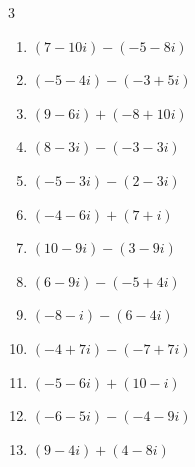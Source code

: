 \begin{multicols}{3}
\begin{enumerate}
        \phantom{$\displaystyle =12+10i$}

  \item $\displaystyle (7-10i) - (-5-8i)$

        \phantom{$\displaystyle =12-2i$}

  \item $\displaystyle (-5-4i) - (-3+5i)$

        \phantom{$\displaystyle =-2-9i$}

  \item $\displaystyle (9-6i) + (-8+10i)$

        \phantom{$\displaystyle =1+4i$}

  \item $\displaystyle (8-3i) - (-3-3i)$

        \phantom{$\displaystyle =11$}

  \item $\displaystyle (-5-3i) - (2-3i)$

        \phantom{$\displaystyle =-7$}

  \item $\displaystyle (-4-6i) + (7+i)$

        \phantom{$\displaystyle =3-5i$}

  \item $\displaystyle (10-9i) - (3-9i)$

        \phantom{$\displaystyle =7$}

  \item $\displaystyle (6-9i) - (-5+4i)$

        \phantom{$\displaystyle =11-13i$}

  \item $\displaystyle (-8-i) - (6-4i)$

        \phantom{$\displaystyle =-14+3i$}

  \item $\displaystyle (-4+7i) - (-7+7i)$

        \phantom{$\displaystyle =3$}

  \item $\displaystyle (-5-6i) + (10-i)$

        \phantom{$\displaystyle =5-7i$}

  \item $\displaystyle (-6-5i) - (-4-9i)$

        \phantom{$\displaystyle =-2+4i$}

  \item $\displaystyle (9-4i) + (4-8i)$


\end{enumerate}
\end{multicols}
